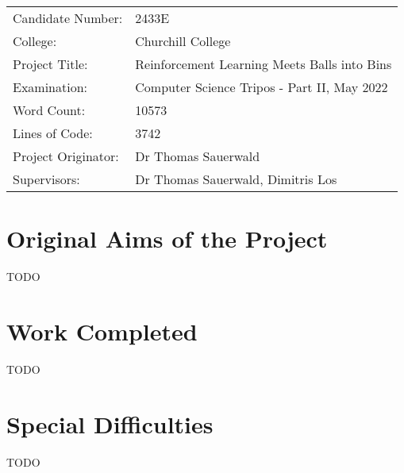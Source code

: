 
\begin{proforma}      


\begin{table}[h]
\begin{tabular}{ll}
Candidate Number:  & 2433E \\
College: & Churchill College \\
Project Title:    &  Reinforcement Learning Meets Balls into Bins  \\
Examination:  & Computer Science Tripos - Part II, May 2022   \\
Word Count:  & 10573 \\
Lines of Code: & 3742 \\
Project Originator: & Dr Thomas Sauerwald \\
Supervisors: & Dr Thomas Sauerwald, Dimitris Los 
\end{tabular}
\end{table}


\section*{Original Aims of the Project}

TODO

\section*{Work Completed}

TODO

\section*{Special Difficulties}

TODO



\end{proforma}
